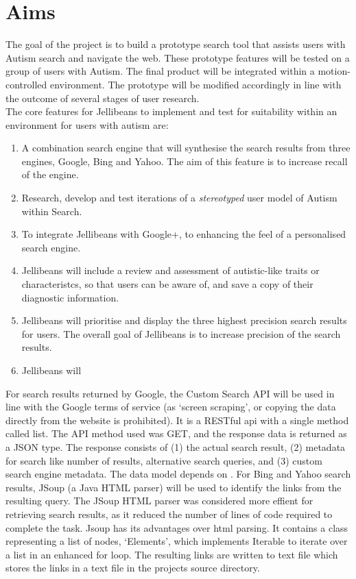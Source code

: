 \documentclass[a4paper, 11pt]{article}
\begin{document}
\section {Aims}
The goal of the project is to build a prototype search tool that assists users with Autism search and navigate the web. These prototype features will be tested on a group of users with Autism. The final product will be integrated within a motion-controlled environment. The prototype will be modified accordingly in line with the outcome of several stages of user research.\\
The core features for Jellibeans to implement and test for suitability within an environment for users with autism are:
\begin{enumerate}
\item{A combination search engine that will synthesise the search results from three engines, Google, Bing and Yahoo. The aim of this feature is to increase recall of the engine.}
\item{Research, develop and test iterations of a \textit{stereotyped} user model of Autism within Search.}
\item{To integrate Jellibeans with Google+, to enhancing the feel of a personalised search engine.}
\item{Jellibeans will include a review and assessment of autistic-like traits or characteristcs, so that users can be aware of, and save a copy of their diagnostic information.}
\item{Jellibeans will prioritise and display the three highest precision search results for users. The overall goal of Jellibeans is to increase precision of the search results.}
\item{Jellibeans will }

\end{enumerate}


For search results returned by Google, the Custom Search API will be used in line with the Google terms of service (as `screen scraping', or copying the data directly from the website is prohibited). It is a RESTful api with a single method called list. The API method used was GET, and the response data is returned as a JSON type. The response consists of (1) the actual search result, (2) metadata for search like number of  results, alternative search queries, and (3) custom search engine metadata. The data model depends on \cite{opensearch}.
For Bing and Yahoo search results, JSoup (a Java HTML parser) will be used to identify the links from the resulting query. The JSoup HTML parser was considered more effient for retrieving search results, as it reduced the number of lines of code required to complete the task. 
Jsoup has its advantages over html parsing. It contains a class representing a list of nodes, `Elements', which implements Iterable to iterate over a list in an enhanced for loop.
The resulting links are written to text file which stores the links in a text file in the projects source directory.
\end{document}
